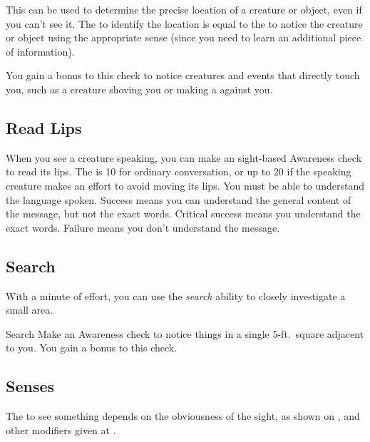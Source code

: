         This can be used to determine the precise location of a creature or object, even if you can't see it. The  to identify the location is equal to the  to notice the creature or object using the appropriate sense  (since you need to learn an additional piece of information).

        You gain a  bonus to this check to notice creatures and events that directly touch you, such as a creature shoving you or making a  against you.

    \subsection{Read Lips}
        When you see a creature speaking, you can make an sight-based Awareness check to read its lips.
        The  is 10 for ordinary conversation, or up to 20 if the speaking creature makes an effort to avoid moving its lips.
        You must be able to understand the language spoken.
        Success means you can understand the general content of the message, but not the exact words.
        Critical success means you understand the exact words.
        Failure means you don't understand the message.

    \subsection{Search}\label{Search}
        With a minute of effort, you can use the \textit{search} ability to closely investigate a small area.
        \begin{freeability}{Search}
            Make an Awareness check to notice things in a single 5-ft.\ square adjacent to you.
            You gain a  bonus to this check.
        \end{freeability}

    \subsection{Senses}\label{Senses}

         The  to see something depends on the obviousness of the sight, as shown on , and other modifiers given at .

